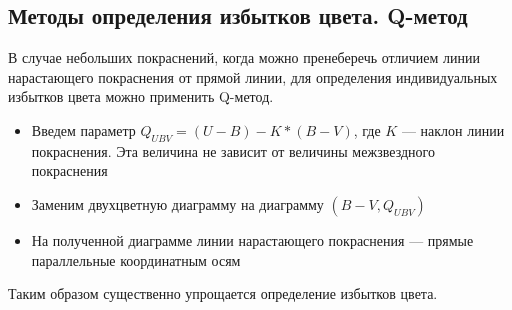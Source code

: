 \documentclass{beamer}
\begin{document}
    \subsection{Методы определения избытков цвета. Q-метод}
    \begin{frame}
        В случае небольших покраснений, когда можно пренеберечь отличием линии нарастающего покраснения от прямой линии, 
        для определения индивидуальных избытков цвета можно применить Q-метод.
        \begin{itemize}
            \item Введем параметр $Q_{UBV} = (U-B) - K*(B-V)$, где $K$ --- наклон линии покраснения. 
            Эта величина не зависит от величины межзвездного покраснения
            \item Заменим двухцветную диаграмму на диаграмму $\left(B-V, Q_{UBV}\right)$
            \item На полученной диаграмме линии нарастающего покраснения --- прямые параллельные координатным осям
        \end{itemize}
        Таким образом существенно упрощается определение избытков цвета.
    \end{frame}
\end{document}
